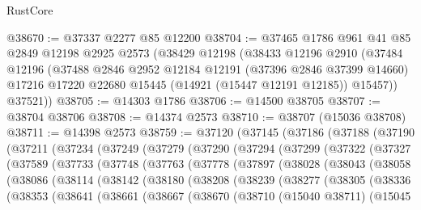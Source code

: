 \begin{lexlean}{RustCore}
\begin{coremodule}
@38670 := @37337 @2277 @85 @12200
@38704 := @37465
    @1786
    @961
    @41
    @85
    @2849
    @12198
    @2925
    @2573
    (@38429
      @12198
      (@38433
        @12196
        @2910
        (@37484
          @12196
          (@37488
            @2846
            @2952
            @12184
            @12191
            (@37396 @2846 @37399 @14660)
            @17216
            @17220
            @22680
            @15445
            (@14921 (@15447 @12191 @12185))
            @15457))
        @37521))
@38705 := @14303 @1786
@38706 := @14500 @38705
@38707 := @38704 @38706
@38708 := @14374 @2573
@38710 := @38707 (@15036 @38708)
@38711 := @14398 @2573
@38759 := @37120
    (@37145
      (@37186
        (@37188
          (@37190
            (@37211
              (@37234
                (@37249
                  (@37279
                    (@37290
                      (@37294
                        (@37299
                          (@37322
                            (@37327
                              (@37589
                                (@37733
                                  (@37748
                                    (@37763
                                      (@37778
                                        (@37897
                                          (@38028
                                            (@38043
                                              (@38058
                                                (@38086
                                                  (@38114
                                                    (@38142
                                                      (@38180
                                                        (@38208
                                                          (@38239
                                                            (@38277
                                                              (@38305
                                                                (@38336
                                                                  (@38353
                                                                    (@38641
                                                                      (@38661
                                                                        (@38667
                                                                          (@38670
                                                                            (@38710
                                                                              (@15040 @38711)
                                                                              (@15045

\end{coremodule}
\end{lexlean}
